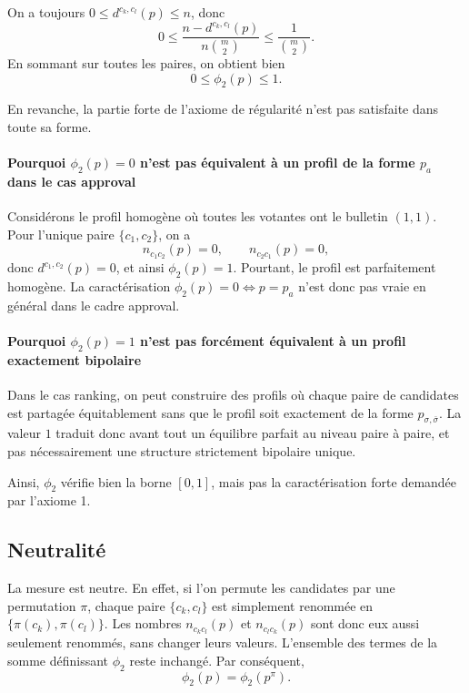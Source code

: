 \documentclass[11pt,a4paper]{article}
\begin{document}
On a toujours \(0 \le d^{c_k,c_l}(p) \le n\), donc
\[
0 \le \frac{n-d^{c_k,c_l}(p)}{n\binom{m}{2}} \le \frac{1}{\binom{m}{2}}.
\]
En sommant sur toutes les paires, on obtient bien
\[
0 \le \phi_2(p) \le 1.
\]

En revanche, la partie forte de l'axiome de r\'egularit\'e n'est pas satisfaite dans toute sa forme.

\paragraph{Pourquoi \(\phi_2(p)=0\) n'est pas \'equivalent \`a un profil de la forme \(p_a\) dans le cas approval}
Consid\'erons le profil homog\`ene o\`u toutes les votantes ont le bulletin \((1,1)\). Pour l'unique paire \(\{c_1,c_2\}\), on a
\[
n_{c_1c_2}(p)=0,\qquad n_{c_2c_1}(p)=0,
\]
donc \(d^{c_1,c_2}(p)=0\), et ainsi \(\phi_2(p)=1\). Pourtant, le profil est parfaitement homog\`ene. La caract\'erisation \(\phi_2(p)=0 \Leftrightarrow p=p_a\) n'est donc pas vraie en g\'en\'eral dans le cadre approval.

\paragraph{Pourquoi \(\phi_2(p)=1\) n'est pas forc\'ement \'equivalent \`a un profil exactement bipolaire}
Dans le cas ranking, on peut construire des profils o\`u chaque paire de candidates est partag\'ee \'equitablement sans que le profil soit exactement de la forme \(p_{\sigma,\bar{\sigma}}\). La valeur \(1\) traduit donc avant tout un \'equilibre parfait au niveau paire \`a paire, et pas n\'ecessairement une structure strictement bipolaire unique.

Ainsi, \(\phi_2\) v\'erifie bien la borne \([0,1]\), mais pas la caract\'erisation forte demand\'ee par l'axiome 1.

\subsection*{Neutralit\'e}

La mesure est neutre. En effet, si l'on permute les candidates par une permutation \(\pi\), chaque paire \(\{c_k,c_l\}\) est simplement renomm\'ee en \(\{\pi(c_k),\pi(c_l)\}\). Les nombres \(n_{c_kc_l}(p)\) et \(n_{c_lc_k}(p)\) sont donc eux aussi seulement renomm\'es, sans changer leurs valeurs. L'ensemble des termes de la somme d\'efinissant \(\phi_2\) reste inchang\'e. Par cons\'equent,
\[
\phi_2(p)=\phi_2(p^\pi).
\]
\end{document}
